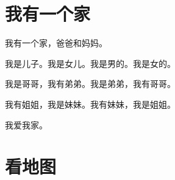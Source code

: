 \documentclass[12pt,UTF-8,openany]{ctexbook}
\begin{document}
\hanzibox{}\hanzibox{}\hanzibox{}\hanzibox{}\hspace{1em}\hanzibox{}\hanzibox{}\hanzibox{}\hanzibox{}

\hanzibox{}\hanzibox{}\hanzibox{}\hanzibox{}\hspace{1em}




\chapter{我有一个家}

\begin{large}
    
    我有一个家，爸爸和妈妈。
    
    我是儿子。我是女儿。我是男的。我是女的。
    
    我是哥哥，我有弟弟。我是弟弟，我有哥哥。
    
    我有姐姐，我是妹妹。我有妹妹，我是姐姐。
    
    我爱我家。
    
\end{large}


\clearpage

\begin{center}
    
    
    
\end{center}


\hanzibox{}\hanzibox{}\hanzibox{}\hanzibox{}\hspace{1em}\hanzibox{}\hanzibox{}\hanzibox{}\hanzibox{}

\hanzibox{}\hanzibox{}\hanzibox{}\hanzibox{}\hspace{1em}\hanzibox{}\hanzibox{}\hanzibox{}\hanzibox{}

\hanzibox{}\hanzibox{}\hanzibox{}\hanzibox{}\hspace{1em}\hanzibox{}\hanzibox{}\hanzibox{}\hanzibox{}

\hanzibox{}\hanzibox{}\hanzibox{}\hanzibox{}\hspace{1em}\hanzibox{}\hanzibox{}\hanzibox{}\hanzibox{}






\chapter{看地图}
\end{document}
